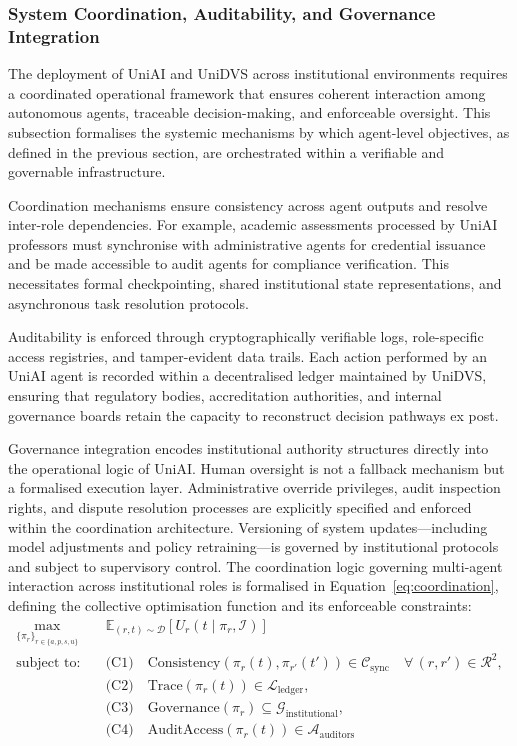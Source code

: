 \documentclass[oneside,10pt]{swissi}
\begin{document}
\subsubsection{System Coordination, Auditability, and Governance Integration}

The deployment of UniAI and UniDVS across institutional environments requires a coordinated operational framework that ensures coherent interaction among autonomous agents, traceable decision-making, and enforceable oversight. This subsection formalises the systemic mechanisms by which agent-level objectives, as defined in the previous section, are orchestrated within a verifiable and governable infrastructure.

Coordination mechanisms ensure consistency across agent outputs and resolve inter-role dependencies. For example, academic assessments processed by UniAI professors must synchronise with administrative agents for credential issuance and be made accessible to audit agents for compliance verification. This necessitates formal checkpointing, shared institutional state representations, and asynchronous task resolution protocols.

Auditability is enforced through cryptographically verifiable logs, role-specific access registries, and tamper-evident data trails. Each action performed by an UniAI agent is recorded within a decentralised ledger maintained by UniDVS, ensuring that regulatory bodies, accreditation authorities, and internal governance boards retain the capacity to reconstruct decision pathways ex post.

Governance integration encodes institutional authority structures directly into the operational logic of UniAI. Human oversight is not a fallback mechanism but a formalised execution layer. Administrative override privileges, audit inspection rights, and dispute resolution processes are explicitly specified and enforced within the coordination architecture. Versioning of system updates—including model adjustments and policy retraining—is governed by institutional protocols and subject to supervisory control. The coordination logic governing multi-agent interaction across institutional roles is formalised in Equation~\ref{eq:coordination}, defining the collective optimisation function and its enforceable constraints:
\begin{align}
\label{eq:coordination}
\max_{\{\pi_r\}_{r \in \{a, p, s, u\}}} \quad & \mathbb{E}_{(r, t) \sim \mathcal{D}} \left[ U_r(t \mid \pi_r, \mathcal{I}) \right] \\
\text{subject to:} \quad
& \text{(C1)} \quad \text{Consistency}(\pi_r(t), \pi_{r'}(t')) \in \mathcal{C}_{\text{sync}} \quad \forall\, (r, r') \in \mathcal{R}^2, \nonumber \\
& \text{(C2)} \quad \text{Trace}(\pi_r(t)) \in \mathcal{L}_{\text{ledger}}, \nonumber \\
& \text{(C3)} \quad \text{Governance}(\pi_r) \subseteq \mathcal{G}_{\text{institutional}}, \nonumber \\
& \text{(C4)} \quad \text{AuditAccess}(\pi_r(t)) \in \mathcal{A}_{\text{auditors}} \nonumber
\end{align}
\end{document}
